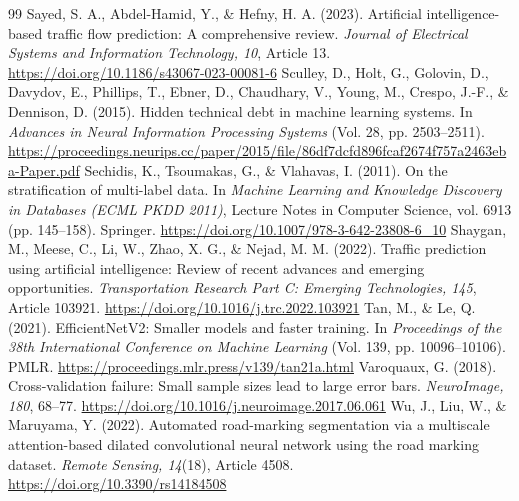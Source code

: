 \documentclass[11pt]{article}
\begin{document}
\begin{thebibliography}{99}
 Sayed, S. A., Abdel-Hamid, Y., \& Hefny, H. A. (2023). Artificial intelligence-based traffic flow prediction: A comprehensive review. \emph{Journal of Electrical Systems and Information Technology, 10}, Article 13. \url{https://doi.org/10.1186/s43067-023-00081-6}
 Sculley, D., Holt, G., Golovin, D., Davydov, E., Phillips, T., Ebner, D., Chaudhary, V., Young, M., Crespo, J.-F., \& Dennison, D. (2015). Hidden technical debt in machine learning systems. In \emph{Advances in Neural Information Processing Systems} (Vol. 28, pp. 2503--2511). \url{https://proceedings.neurips.cc/paper/2015/file/86df7dcfd896fcaf2674f757a2463eba-Paper.pdf}
 Sechidis, K., Tsoumakas, G., \& Vlahavas, I. (2011). On the stratification of multi-label data. In \emph{Machine Learning and Knowledge Discovery in Databases (ECML PKDD 2011)}, Lecture Notes in Computer Science, vol. 6913 (pp. 145--158). Springer. \url{https://doi.org/10.1007/978-3-642-23808-6_10}
 Shaygan, M., Meese, C., Li, W., Zhao, X. G., \& Nejad, M. M. (2022). Traffic prediction using artificial intelligence: Review of recent advances and emerging opportunities. \emph{Transportation Research Part C: Emerging Technologies, 145}, Article 103921. \url{https://doi.org/10.1016/j.trc.2022.103921}
 Tan, M., \& Le, Q. (2021). EfficientNetV2: Smaller models and faster training. In \emph{Proceedings of the 38th International Conference on Machine Learning} (Vol. 139, pp. 10096--10106). PMLR. \url{https://proceedings.mlr.press/v139/tan21a.html}
 Varoquaux, G. (2018). Cross-validation failure: Small sample sizes lead to large error bars. \emph{NeuroImage, 180}, 68--77. \url{https://doi.org/10.1016/j.neuroimage.2017.06.061}
 Wu, J., Liu, W., \& Maruyama, Y. (2022). Automated road-marking segmentation via a multiscale attention-based dilated convolutional neural network using the road marking dataset. \emph{Remote Sensing, 14}(18), Article 4508. \url{https://doi.org/10.3390/rs14184508}
\end{thebibliography}

\appendix
\renewcommand{\thetable}{\thesection\arabic{table}}
\renewcommand{\theHtable}{\thesection.\arabic{table}}
\setcounter{table}{0}
\end{document}
